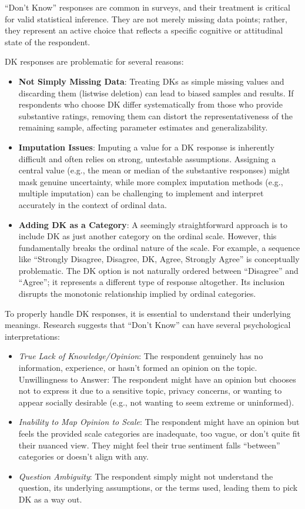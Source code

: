 \documentclass[
  letterpaper,
  DIV=11,
  numbers=noendperiod]{scrartcl}
\providecommand{\tightlist}{%
  \setlength{\itemsep}{0pt}\setlength{\parskip}{0pt}}\usepackage{longtable,booktabs,array}
\begin{document}
``Don't Know'' responses are common in surveys, and their treatment is
critical for valid statistical inference. They are not merely missing
data points; rather, they represent an active choice that reflects a
specific cognitive or attitudinal state of the respondent.

DK responses are problematic for several reasons:

\begin{itemize}
\item
  \textbf{Not Simply Missing Data}: Treating DKs as simple missing
  values and discarding them (listwise deletion) can lead to biased
  samples and results. If respondents who choose DK differ
  systematically from those who provide substantive ratings, removing
  them can distort the representativeness of the remaining sample,
  affecting parameter estimates and generalizability.
\item
  \textbf{Imputation Issues}: Imputing a value for a DK response is
  inherently difficult and often relies on strong, untestable
  assumptions. Assigning a central value (e.g., the mean or median of
  the substantive responses) might mask genuine uncertainty, while more
  complex imputation methods (e.g., multiple imputation) can be
  challenging to implement and interpret accurately in the context of
  ordinal data.
\item
  \textbf{Adding DK as a Category}: A seemingly straightforward approach
  is to include DK as just another category on the ordinal scale.
  However, this fundamentally breaks the ordinal nature of the scale.
  For example, a sequence like ``Strongly Disagree, Disagree, DK, Agree,
  Strongly Agree'' is conceptually problematic. The DK option is not
  naturally ordered between ``Disagree'' and ``Agree''; it represents a
  different type of response altogether. Its inclusion disrupts the
  monotonic relationship implied by ordinal categories.
\end{itemize}

To properly handle DK responses, it is essential to understand their
underlying meanings. Research suggests that ``Don't Know'' can have
several psychological interpretations:

\begin{itemize}
\tightlist
\item
  \emph{True Lack of Knowledge/Opinion}: The respondent genuinely has no
  information, experience, or hasn't formed an opinion on the topic.
  Unwillingness to Answer: The respondent might have an opinion but
  chooses not to express it due to a sensitive topic, privacy concerns,
  or wanting to appear socially desirable (e.g., not wanting to seem
  extreme or uninformed).
\item
  \emph{Inability to Map Opinion to Scale}: The respondent might have an
  opinion but feels the provided scale categories are inadequate, too
  vague, or don't quite fit their nuanced view. They might feel their
  true sentiment falls ``between'' categories or doesn't align with any.
\item
  \emph{Question Ambiguity}: The respondent simply might not understand
  the question, its underlying assumptions, or the terms used, leading
  them to pick DK as a way out.
\end{itemize}
\end{document}

